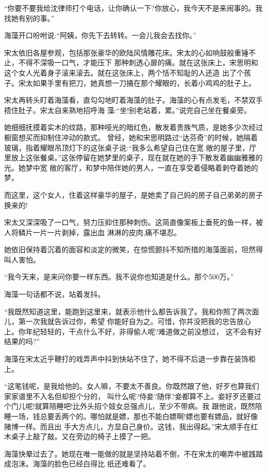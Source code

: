 \documentclass[11pt,a4paper,onecolumn]{article}
\begin{document}
``你要不要我给沈律师打个电话，让你确认一下?你放心，我今天不是来闹事的。我找她有别的事。''

海藻开口吩咐说:``阿姨，你先下去转转。一会儿我会去找你。''

宋太依旧各屋参观，包括那张豪华的欧陆风情雕花床。宋太的心如响鼓般重锤不止，不得不深吸一口气，才能压下
那种刺透心扉的痛。就在这张床上，宋思明和这个女人光着身子滚来滚去。就在这张床上，两个恬不知耻的人还造
出了个孩子。宋太如果手里有把刀，她真想一刀捅在那个耀眼的，长着小鸡鸡的肚子上。

宋太再转头盯着海藻看，直勾勾地盯着海藻的肚子。海藻的心有点发毛，不禁双手捂住肚子。宋太自来熟地招呼海
藻:``坐!别老站着，累。''说完自己坐在餐桌旁。

她细细抚摸着实木的纹路，那种哑光的暗红色，散发着贵族气质，是她多少次经过橱窗想买而抑制住冲动的款式。
曾经，她和宋思明路过``达芬奇''的时候，她隔着玻璃，指着耀眼吊顶灯下的这张桌子说:``我多么希望自己住在宽
敞的屋子里，厅里放上这张餐桌。''这张停留在她梦里的桌子，现在就在她的手下散发着幽幽雅雅的光。她梦中宽
敞的客厅，和梦中陪伴她的男人，一直在享受着侵略着剥夺着她的梦。

而这里，这个女人，住着这样豪华的屋子，是她卖了自己妈的房子自己弟弟的房子换来的!

宋太又深深吸了一口气，努力压抑住那种刺伤。这简直像案板上垂死的鱼一样，被人将鳞片一片一片剥掉，露出血
淋淋的皮肉,痛不堪忍。

她依旧保持着沉着的面容和淡定的微笑，在惊慌颤抖不知所措的海藻面前，坦然得叫人害怕。

``我今天来，是来问你要一样东西。我不说你也知道是什么。那个500万。''

海藻一句话都不说，站着发抖。

``我既然知道这里，能跑到这里来，就表示他什么都告诉我了。我和你照了两次面儿，第一次我就告诉过你，希望
你能好自为之。可惜，你并没把我的忠告放心上。你年纪轻轻的，干点什么不好，非得偷人呢?难道做之前没想过，
这不会有好结果的吗?''

海藻在宋太近乎鞭打的戏弄声中抖到快站不住了，她不得不后退一步靠在装饰柜上。

``这笔钱呢，是我给他的。女人嘛，不要太不善良。你既然跟了他，好歹也算我们家家谱里不入名但却担个分的，
叫什么呢?侍妾?随伴?妾都算不上。妾好歹还要过个门儿呢!就算陪睡吧!比外头招个妓女总强点儿，至少不带病。我
跟他说，既然陪睡一场，钱总要丢两个的。哪怕就是嫖，那也不能白嫖啊!嫖也要有嫖品，就好像赌博一样。而且出
手大方点儿，方显自己身价。这钱，我出得起。''宋太顺手在红木桌子上敲了敲。又在旁边的椅子上摸了一把。

海藻快晕过去了。她现在唯一能做的就是坚持站着不倒，不在宋太的嘲弄中被践踏成泡沫。海藻的脸色已经白得比
纸还难看了。
\end{document}
